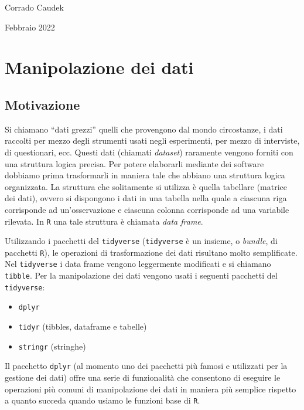 \documentclass[
  10pt,
  italian,
  a4paper,
  extrafontsizes,onecolumn,openright
  ]{memoir}
\providecommand{\tightlist}{%
  \setlength{\itemsep}{0pt}\setlength{\parskip}{0pt}}
\begin{document}
\bigskip

Corrado Caudek

\bigskip

Febbraio 2022

\mainmatter

\hypertarget{manipolazione-dei-dati}{%
\section{Manipolazione dei dati}\label{manipolazione-dei-dati}}

\hypertarget{motivazione}{%
\subsection{Motivazione}\label{motivazione}}

Si chiamano ``dati grezzi'' quelli che provengono dal mondo circostanze, i
dati raccolti per mezzo degli strumenti usati negli esperimenti, per
mezzo di interviste, di questionari, ecc. Questi dati (chiamati
\emph{dataset}) raramente vengono forniti con una struttura logica precisa.
Per potere elaborarli mediante dei software dobbiamo prima trasformarli
in maniera tale che abbiano una struttura logica organizzata. La
struttura che solitamente si utilizza è quella tabellare (matrice dei
dati), ovvero si dispongono i dati in una tabella nella quale a ciascuna
riga corrisponde ad un'osservazione e ciascuna colonna corrisponde ad
una variabile rilevata. In \texttt{R} una tale struttura è chiamata \emph{data frame}.

Utilizzando i pacchetti del \texttt{tidyverse} (\texttt{tidyverse} è un insieme, o \emph{bundle}, di pacchetti \texttt{R}), le operazioni di trasformazione dei dati risultano molto semplificate. Nel \texttt{tidyverse} i data frame vengono leggermente modificati e si chiamano \texttt{tibble}. Per la manipolazione dei dati vengono usati i seguenti pacchetti del \texttt{tidyverse}:

\begin{itemize}
\tightlist
\item
  \texttt{dplyr}
\item
  \texttt{tidyr} (tibbles, dataframe e tabelle)
\item
  \texttt{stringr} (stringhe)
\end{itemize}

Il pacchetto \texttt{dplyr} (al momento uno dei pacchetti più famosi e utilizzati per la gestione dei dati) offre una serie di funzionalità che consentono di eseguire le operazioni più comuni di manipolazione dei dati in maniera più semplice rispetto a quanto succeda quando usiamo le funzioni base di \texttt{R}.
\end{document}
